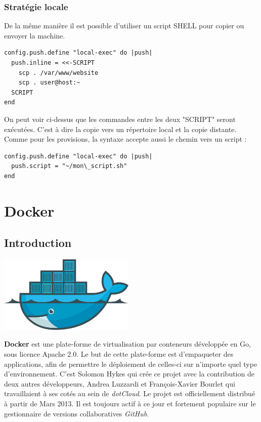 \documentclass[12pt,a4paper]{article}
\begin{document}
\subsubsection{Stratégie locale}
De la même manière il est possible d'utiliser un script SHELL pour copier ou envoyer la machine.
\begin{lstlisting}
config.push.define "local-exec" do |push|
  push.inline = <<-SCRIPT
    scp . /var/www/website
	scp . user@host:~
  SCRIPT
end
\end{lstlisting}
On peut voir ci-dessus que les commandes entre les deux "SCRIPT" seront exécutées. C'est à dire la copie vers un répertoire local et la copie distante. Comme pour les provisions, la syntaxe accepte aussi le chemin vers un script :
\begin{lstlisting}
config.push.define "local-exec" do |push|
  push.script = "~/mon\_script.sh"
end
\end{lstlisting}

\newpage{}

\section{Docker}

\subsection{Introduction}
\begin{center}
  \includegraphics[width=6.5cm]{images_rapport/docker_logo.jpg}
\end{center}

\textbf{Docker} est une plate-forme de virtualisation par conteneurs développée en Go, sous licence Apache 2.0. Le but de cette plate-forme est d'empaqueter des applications, afin de permettre le déploiement de celles-ci sur n'importe quel type d'environnement. C'est Solomon Hykes qui crée ce projet avec la contribution de deux autres développeurs, Andrea Luzzardi et François-Xavier Bourlet qui travaillaient à ses cotés au sein de \textit{dotCloud}. Le projet est officiellement distribué à partir de Mars 2013. Il est toujours actif à ce jour et fortement populaire sur le gestionnaire de versions collaboratives \textit{GitHub}.
\end{document}
